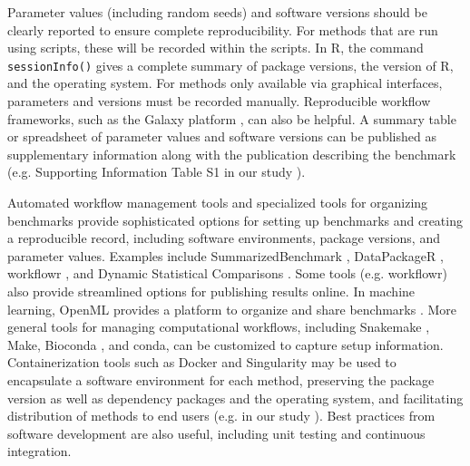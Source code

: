Parameter values (including random seeds) and software versions should be clearly reported to ensure complete reproducibility. For methods that are run using scripts, these will be recorded within the scripts. In R, the command \texttt{sessionInfo()} gives a complete summary of package versions, the version of R, and the operating system. For methods only available via graphical interfaces, parameters and versions must be recorded manually. Reproducible workflow frameworks, such as the Galaxy platform \cite{afgan_galaxyplatformaccessible_2018}, can also be helpful. A summary table or spreadsheet of parameter values and software versions can be published as supplementary information along with the publication describing the benchmark (e.g. Supporting Information Table S1 in our study \cite{weber_comparisonclusteringmethods_2016}).

Automated workflow management tools and specialized tools for organizing benchmarks provide sophisticated options for setting up benchmarks and creating a reproducible record, including software environments, package versions, and parameter values. Examples include SummarizedBenchmark \cite{kimes_reproduciblereplicablecomparisons_2019}, DataPackageR \cite{finak_datapackagerreproducibledata_2018}, workflowr \cite{blischak_workflowrframeworkreproducible_2019}, and Dynamic Statistical Comparisons \cite{wang_dscdynamicstatistical_2016}. Some tools (e.g. workflowr) also provide streamlined options for publishing results online. In machine learning, OpenML provides a platform to organize and share benchmarks \cite{vanschoren_openmlnetworkedscience_2014}. More general tools for managing computational workflows, including Snakemake \cite{koster_snakemakescalablebioinformatics_2012}, Make, Bioconda \cite{gruning_biocondasustainablecomprehensive_2018}, and conda, can be customized to capture setup information. Containerization tools such as Docker and Singularity may be used to encapsulate a software environment for each method, preserving the package version as well as dependency packages and the operating system, and facilitating distribution of methods to end users (e.g. in our study \cite{saelens_comparisonsinglecelltrajectory_2019}). Best practices from software development are also useful, including unit testing and continuous integration.

